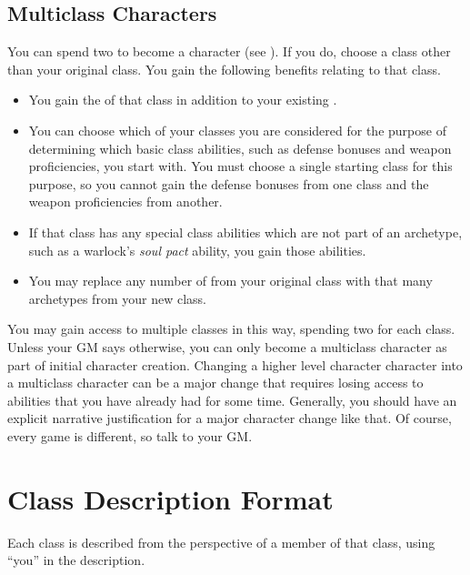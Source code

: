         \subsection{Multiclass Characters}\label{Multiclass Characters}
            You can spend two  to become a  character (see ).
            If you do, choose a class other than your original class.
            You gain the following benefits relating to that class.
            \begin{itemize}
                \item You gain the  of that class in addition to your existing .
                \item You can choose which of your classes you are considered for the purpose of determining which basic class abilities, such as defense bonuses and weapon proficiencies, you start with.
                    You must choose a single starting class for this purpose, so you cannot gain the defense bonuses from one class and the weapon proficiencies from another.
                \item If that class has any special class abilities which are not part of an archetype, such as a warlock's \textit{soul pact} ability, you gain those abilities.
                \item You may replace any number of  from your original class with that many archetypes from your new class.
            \end{itemize}

            You may gain access to multiple classes in this way, spending two  for each class.
            Unless your GM says otherwise, you can only become a multiclass character as part of initial character creation.
            Changing a higher level character character into a multiclass character can be a major change that requires losing access to abilities that you have already had for some time.
            Generally, you should have an explicit narrative justification for a major character change like that.
            Of course, every game is different, so talk to your GM.

\section{Class Description Format}
    Each class is described from the perspective of a member of that class, using ``you'' in the description.

